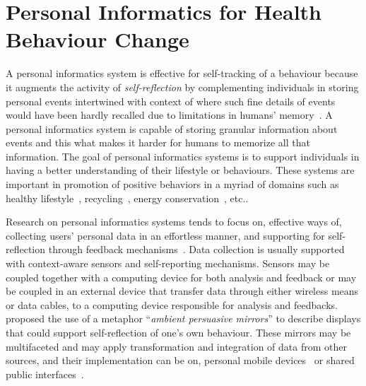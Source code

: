 \section{Personal Informatics for Health Behaviour Change}
A personal informatics system is effective for self-tracking of a behaviour because it augments the activity of \emph{self-reflection} by complementing individuals in storing personal events intertwined with context of where such fine details of events would have been hardly recalled due to limitations in humans' memory~\citep{li2010stage}. A personal informatics system is capable of storing granular information about events and this what makes it harder for humans to memorize all that information. The goal of personal informatics systems is to support individuals in having a better understanding of their lifestyle or behaviours. These systems are important in promotion of positive behaviors in a myriad of domains such as healthy lifestyle~\citep{korhonen2010personal}, recycling~\citep{comber2013designing}, energy conservation~\citep{seligman1977feedback}, etc.. 

Research on personal informatics systems tends to focus on, effective ways of, collecting users' personal data in an effortless manner, and supporting for self-reflection through feedback mechanisms~\citep{li2011understanding}. Data collection is usually supported with context-aware sensors and self-reporting mechanisms. Sensors may be coupled together with a computing device for both analysis and feedback or may be coupled in an external device that transfer data through either wireless means or data cables, to a computing device responsible for analysis and feedbacks.~\cite{nakajima2013designing} proposed the use of a metaphor ``\emph{ambient persuasive mirrors}'' to describe displays that could support self-reflection of one's own behaviour. These mirrors may be multifaceted and may apply transformation and integration of data from other sources, and their implementation can be on, personal mobile devices~\citep{klasnja2009:using} or shared public interfaces~\citep{lin2006:fish}.

